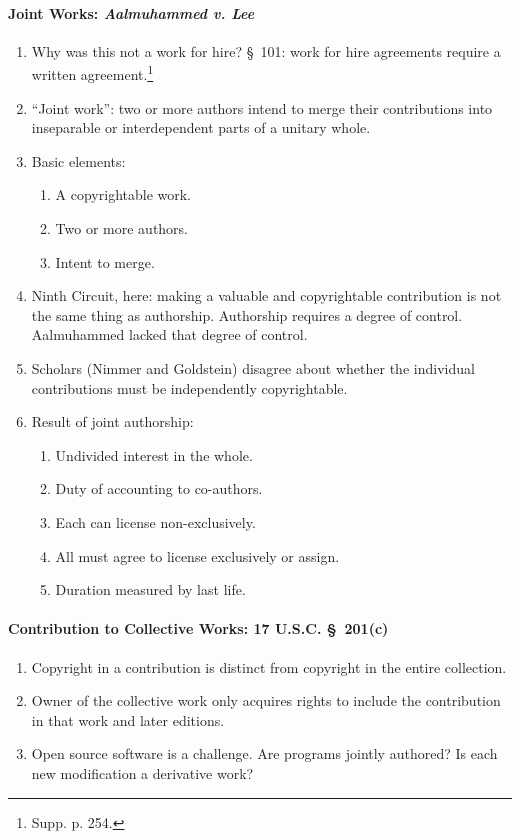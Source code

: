 \paragraph{Joint Works: \emph{Aalmuhammed v. Lee}}

\begin{enumerate}
    \item Why was this not a work for hire? \S\ 101: work for hire agreements 
    require a written agreement.\footnote{Supp. p. 254.}
    \item ``Joint work'': two or more authors intend to merge their 
    contributions into inseparable or interdependent parts of a unitary whole.
    \item Basic elements:
    \begin{enumerate}
        \item A copyrightable work.
        \item Two or more authors.
        \item Intent to merge.
    \end{enumerate}
    \item Ninth Circuit, here: making a valuable and copyrightable 
    contribution is not the same thing as authorship. Authorship requires a 
    degree of control. Aalmuhammed lacked that degree of control.
    \item Scholars (Nimmer and Goldstein) disagree about whether the 
    individual contributions must be independently copyrightable.
    \item Result of joint authorship:
    \begin{enumerate}
        \item Undivided interest in the whole.
        \item Duty of accounting to co-authors.
        \item Each can license non-exclusively.
        \item All must agree to license exclusively or assign.
        \item Duration measured by last life.
    \end{enumerate}
\end{enumerate}

\paragraph{Contribution to Collective Works: 17 U.S.C. \S\ 201(c)}

\begin{enumerate}
    \item Copyright in a contribution is distinct from copyright in the entire 
    collection.
    \item Owner of the collective work only acquires rights to include the 
    contribution in that work and later editions.
    \item Open source software is a challenge. Are programs jointly authored? 
    Is each new modification a derivative work?
\end{enumerate}

